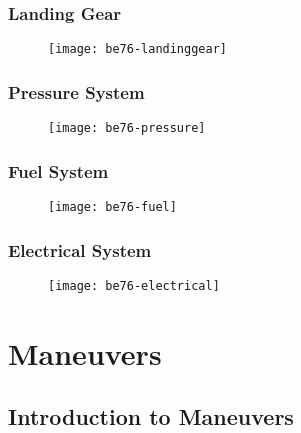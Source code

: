{\subsection{Landing Gear}

\begin{figure}[H]
\begin{center}
\texttt{[image: be76-landinggear]}
\end{center}
\end{figure}

\newpage

\subsection{Pressure System}

\begin{figure}[H]
\begin{center}
\texttt{[image: be76-pressure]}
\end{center}
\end{figure}

\newpage

\subsection{Fuel System}

\begin{figure}[H]
\begin{center}
\texttt{[image: be76-fuel]}
\end{center}
\end{figure}

\newpage

\subsection{Electrical System}

\begin{figure}[H]
\begin{center}
\texttt{[image: be76-electrical]}
\end{center}
\end{figure}

\chapter{Maneuvers}

\section{Introduction to Maneuvers}

}
